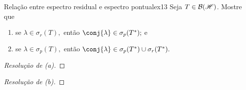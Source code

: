 \begin{exercício}{Relação entre espectro residual e espectro pontual}{ex13}
    Seja \(T \in \mathcal{B}(\mathscr{H})\). Mostre que
    \begin{enumerate}[label=(\alph*)]
      \item se \(\lambda \in \sigma_r(T),\) então \(\conj{\lambda} \in \sigma_p(T^*);\) e
      \item se \(\lambda \in \sigma_p(T),\) então \(\conj{\lambda} \in \sigma_p(T^*) \cup \sigma_r(T^*).\)
    \end{enumerate}
\end{exercício}
\begin{proof}[Resolução de (a)]

\end{proof}
\begin{proof}[Resolução de (b)]

\end{proof}
